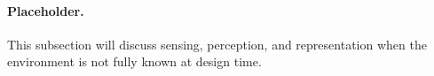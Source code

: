 \paragraph{Placeholder.}
This subsection will discuss sensing, perception, and representation when the environment is not fully known at design time.
